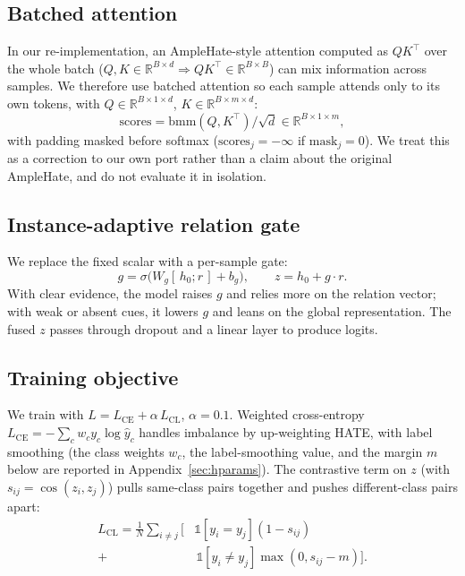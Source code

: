 \documentclass[11pt]{article}
\begin{document}
\subsection{Batched attention}
In our re-implementation, an AmpleHate-style attention computed as $QK^\top$ over the whole batch ($Q,K\in\mathbb{R}^{B\times d}\Rightarrow QK^\top\in\mathbb{R}^{B\times B}$) can mix information across samples. We therefore use batched attention so each sample attends only to its own tokens, with $Q\in\mathbb{R}^{B\times 1\times d}$, $K\in\mathbb{R}^{B\times m\times d}$:
\begin{equation}
  \mathrm{scores} = \mathrm{bmm}(Q,K^\top)/\sqrt d \in\mathbb{R}^{B\times1\times m},
\end{equation}
with padding masked before softmax ($\mathrm{scores}_j=-\infty$ if $\mathrm{mask}_j=0$). We treat this as a correction to our own port rather than a claim about the original AmpleHate, and do not evaluate it in isolation.

\subsection{Instance-adaptive relation gate}
We replace the fixed scalar with a per-sample gate:
\begin{equation}
  g = \sigma\big(W_g[\,h_0;r\,] + b_g\big),\qquad z = h_0 + g\cdot r.
\end{equation}
With clear evidence, the model raises $g$ and relies more on the relation vector; with weak or absent cues, it lowers $g$ and leans on the global representation. The fused $z$ passes through dropout and a linear layer to produce logits.

\subsection{Training objective}
We train with $L = L_{\mathrm{CE}} + \alpha\,L_{\mathrm{CL}}$, $\alpha=0.1$. Weighted cross-entropy $L_{\mathrm{CE}}=-\sum_c w_c y_c\log\hat y_c$ handles imbalance by up-weighting HATE, with label smoothing \citep{muller2019labelsmoothing} (the class weights $w_c$, the label-smoothing value, and the margin $m$ below are reported in Appendix~\ref{sec:hparams}). The contrastive term on $z$ (with $s_{ij}=\cos(z_i,z_j)$) pulls same-class pairs together and pushes different-class pairs apart:
\begin{equation}
\begin{split}
  L_{\mathrm{CL}} = \frac{1}{N}\sum_{i\neq j}\big[&\mathbb{1}[y_i{=}y_j](1-s_{ij}) \\[-2pt]
   + &\,\mathbb{1}[y_i{\neq}y_j]\max(0, s_{ij}-m)\big].
\end{split}
\end{equation}
\end{document}
